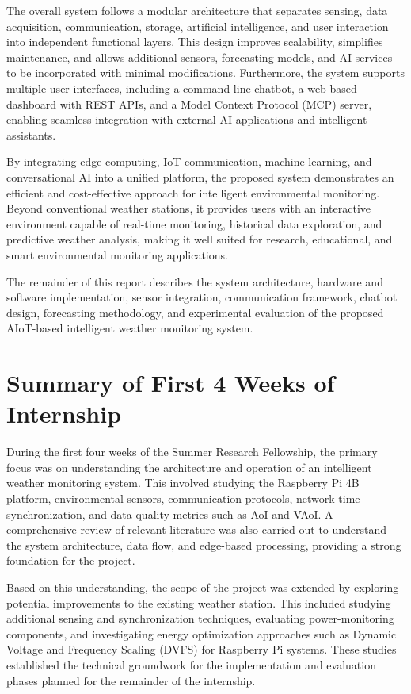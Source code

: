 \documentclass[12pt]{article}
\begin{document}
The overall system follows a modular architecture that separates sensing, data acquisition, communication, storage, artificial intelligence, and user interaction into independent functional layers. This design improves scalability, simplifies maintenance, and allows additional sensors, forecasting models, and AI services to be incorporated with minimal modifications. Furthermore, the system supports multiple user interfaces, including a command-line chatbot, a web-based dashboard with REST APIs, and a Model Context Protocol (MCP) server, enabling seamless integration with external AI applications and intelligent assistants.

By integrating edge computing, IoT communication, machine learning, and conversational AI into a unified platform, the proposed system demonstrates an efficient and cost-effective approach for intelligent environmental monitoring. Beyond conventional weather stations, it provides users with an interactive environment capable of real-time monitoring, historical data exploration, and predictive weather analysis, making it well suited for research, educational, and smart environmental monitoring applications.

The remainder of this report describes the system architecture, hardware and software implementation, sensor integration, communication framework, chatbot design, forecasting methodology, and experimental evaluation of the proposed AIoT-based intelligent weather monitoring system.


\section{Summary of First 4 Weeks of Internship}
During the first four weeks of the Summer Research Fellowship, the primary focus was on understanding the architecture and operation of an intelligent weather monitoring system. This involved studying the Raspberry Pi 4B platform, environmental sensors, communication protocols, network time synchronization, and data quality metrics such as AoI and VAoI. A comprehensive review of relevant literature was also carried out to understand the system architecture, data flow, and edge-based processing, providing a strong foundation for the project.

Based on this understanding, the scope of the project was extended by exploring potential improvements to the existing weather station. This included studying additional sensing and synchronization techniques, evaluating power-monitoring components, and investigating energy optimization approaches such as Dynamic Voltage and Frequency Scaling (DVFS) for Raspberry Pi systems. These studies established the technical groundwork for the implementation and evaluation phases planned for the remainder of the internship.
\end{document}
